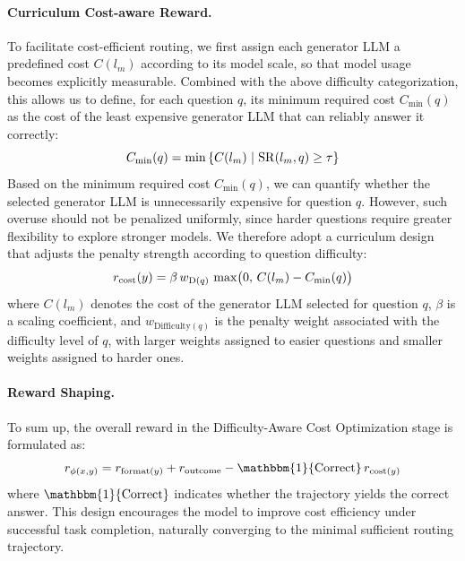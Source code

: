 \paragraph{Curriculum Cost-aware Reward.}
To facilitate cost-efficient routing, we first assign each generator LLM a predefined cost $C(l_m)$ according to its model scale, so that model usage becomes explicitly measurable. Combined with the above difficulty categorization, this allows us to define, for each question $q$, its minimum required cost $C_{\min}(q)$ as the cost of the least expensive generator LLM that can reliably answer it correctly:
\[
\small
C_{\min}(q)=\min \left\{ C(l_m)\ \middle|\ \mathrm{SR}(l_m,q)\ge \tau \right\}
\]
Based on the minimum required cost $C_{\min}(q)$, we can quantify whether the selected generator LLM is unnecessarily expensive for question $q$. However, such overuse should not be penalized uniformly, since harder questions require greater flexibility to explore stronger models. We therefore adopt a curriculum design that adjusts the penalty strength according to question difficulty:
\[
\small
r_{\mathrm{cost}}(y)=
\beta\, w_{\mathrm{D}(q)} \, \max \bigl(0,\, C(l_m) - C_{\min}(q)\bigr)
\]
where $C(l_m)$ denotes the cost of the generator LLM selected for question $q$, $\beta$ is a scaling coefficient, and $w_{\mathrm{Difficulty}(q)}$ is the penalty weight associated with the difficulty level of $q$, with larger weights assigned to easier questions and smaller weights assigned to harder ones.

\paragraph{Reward Shaping.} To sum up, the overall reward in the Difficulty-Aware Cost Optimization stage is formulated as:
\[
r_{\phi(x,y)} = r_{\mathrm{format}(y)} + r_{\mathrm{outcome}} - \mathbbm{1}\{\mathrm{Correct}\}\, r_{\mathrm{cost}(y)}
\]
where $\mathbbm{1}\{\mathrm{\mathrm{Correct}}\}$ indicates whether the trajectory yields the correct answer. This design encourages the model to improve cost efficiency under successful task completion, naturally converging to the minimal sufficient routing trajectory.

